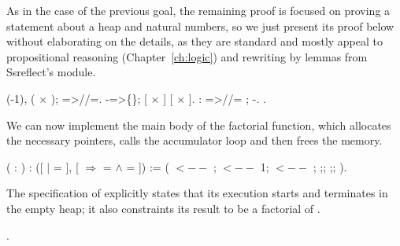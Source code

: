 \coqdocemptyline
As in the case of the previous goal, the remaining proof is focused on
proving a statement about a heap and natural numbers, so we just
present its proof below without elaborating on the details, as they
are standard and mostly appeal to propositional reasoning
(Chapter~\ref{ch:logic}) and rewriting by lemmas from Ssreflect's
 module.
\begin{coqdoccode}
\coqdocemptyline
\coqdocnoindent
{} (-1), ( \ensuremath{\times} ); =>//=.\coqdoceol
\coqdocnoindent
{} -=>\{\};  [ \ensuremath{\times} \coqdocvar{\_}]  [\coqdocvar{\_} \ensuremath{\times} ].\coqdoceol
\coqdocnoindent
{} :  =>//=  \coqdocvar{\_};   -.\coqdoceol
\coqdocnoindent
{}.\coqdoceol
\coqdocemptyline
\end{coqdoccode}


We can now implement the main body of the factorial function, which
allocates the necessary pointers, calls the accumulator loop and then
frees the memory.
\begin{coqdoccode}
\coqdocemptyline
\coqdocnoindent
{}  ( : ) : \coqdoceol
\coqdocindent{1.00em}
 ([  \ensuremath{|}  = ], \coqdoceol
\coqdocindent{4.50em}
[   \ensuremath{\Rightarrow}  =   \ensuremath{\land}  = ]) := \coqdoceol
\coqdocindent{1.00em}
 (   $\mathtt{<--}$  ;\coqdoceol
\coqdocindent{3.00em}
 $\mathtt{<--}$  1;\coqdoceol
\coqdocindent{3.00em}
 $\mathtt{<--}$    ;\coqdoceol
\coqdocindent{3.00em}
 ;;\coqdoceol
\coqdocindent{3.00em}
 ;;\coqdoceol
\coqdocindent{3.00em}
 ).\coqdoceol
\coqdocemptyline
\end{coqdoccode}


The specification of  explicitly states that its execution
starts and terminates in the empty heap; it also constraints its
result to be a factorial of .
\begin{coqdoccode}
\coqdocemptyline
\coqdocnoindent
{} .\coqdoceol
\coqdocemptyline
\end{coqdoccode}


